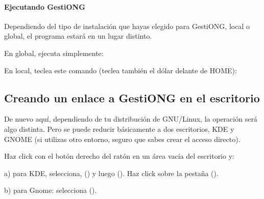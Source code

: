 \paragraph{Ejecutando GestiONG}
Dependiendo del tipo de instalación que hayas elegido para GestiONG,
local o global, el programa estará en un lugar distinto. 

En global, ejecuta simplemente:



\begin{center}
\begin{minipage}{16.48cm}
\end{minipage}
\end{center}

\bigskip

En local, teclea este comando (teclea también el dólar delante de
HOME):



\begin{center}
\begin{minipage}{16.48cm}
\end{minipage}
\end{center}

\bigskip


\bigskip

\subsection{Creando un enlace a GestiONG en el escritorio}
\label{ref:creaenlace}De nuevo aquí, dependiendo de tu distribución
de GNU/Linux, la operación será algo distinta. Pero se puede
reducir básicamente a dos escritorios, KDE y GNOME (si utilizas otro
entorno, seguro que sabes crear el acceso directo).

Haz click con el botón derecho del ratón en un área vacía del
escritorio y:

a) para KDE, selecciona, {\textquotesingle}
({\textquotesingle}) y luego
{\textquotesingle}
({\textquotesingle}). Haz click sobre la pestaña
{\textquotesingle}
({\textquotesingle}).

b) para Gnome: selecciona {\textquotesingle}
({\textquotesingle}).

